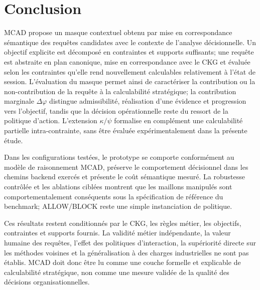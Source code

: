 \documentclass[journal]{IEEEtran}
\begin{document}
\begingroup
\raggedbottom
\setlength{\parskip}{0pt}
\section{Conclusion}
\label{sec:conclusion}

MCAD propose un masque contextuel obtenu par mise en correspondance sémantique des requêtes candidates avec le contexte de l'analyse décisionnelle. Un objectif explicite est décomposé en contraintes et supports suffisants; une requête est abstraite en plan canonique, mise en correspondance avec le CKG et évaluée selon les contraintes qu'elle rend nouvellement calculables relativement à l'état de session. L'évaluation du masque permet ainsi de caractériser la contribution ou la non-contribution de la requête à la calculabilité stratégique; la contribution marginale $\Delta\varphi$ distingue admissibilité, réalisation d'une évidence et progression vers l'objectif, tandis que la décision opérationnelle reste du ressort de la politique d'action. L'extension $\kappa/\psi$ formalise en complément une calculabilité partielle intra-contrainte, sans être évaluée expérimentalement dans la présente étude.

Dans les configurations testées, le prototype se comporte conformément au modèle de raisonnement MCAD, préserve le comportement décisionnel dans les chemins backend exercés et présente le coût sémantique mesuré. La robustesse contrôlée et les ablations ciblées montrent que les maillons manipulés sont comportementalement conséquents sous la spécification de référence du benchmark; ALLOW/BLOCK reste une simple instanciation de politique.

Ces résultats restent conditionnés par le CKG, les règles métier, les objectifs, contraintes et supports fournis. La validité métier indépendante, la valeur humaine des requêtes, l'effet des politiques d'interaction, la supériorité directe sur les méthodes voisines et la généralisation à des charges industrielles ne sont pas établis. MCAD doit donc être lu comme une couche formelle et explicable de calculabilité stratégique, non comme une mesure validée de la qualité des décisions organisationnelles.

\endgroup

\FloatBarrier
\appendices


\FloatBarrier
\balance


\end{document}
